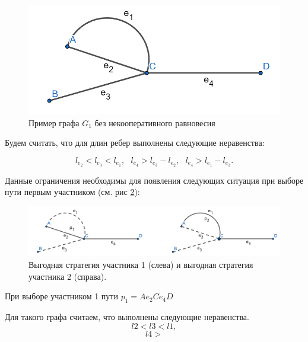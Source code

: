 \documentclass[12pt, a4paper]{article}
\begin{document}
\begin{figure}[hpt]
	\includegraphics[scale = 0.3]{imgs/graph_nocoop.png}
	\centering
	\caption{Пример графа $G_1$ без некооперативного равновесия}
	\label{fig:nocoop}
\end{figure}

Будем считать, что для длин ребер выполнены следующие неравенства:

$$ l_{e_2} < l_{e_3} < l_{e_1}, \text{ } l_{e_4} > l_{e_3} - l_{e_2}, \text{ } l_{e_4} > l_{e_1} - l_{e_3}. $$

Данные ограничения необходимы для появления следующих ситуация при выборе пути первым участником (см. рис \ref{fig:nocoop_str}):

\begin{figure}[hpt]
	\includegraphics[scale = 0.3]{imgs/no_nocoop_rovn.png}
	\centering
	\caption{Выгодная стратегия участника 1 (слева) и выгодная стратегия участника 2 (справа).}
	\label{fig:nocoop_str}
\end{figure}

При выборе участником 1 пути $p_1 = Ae_2Ce_4D$ 

Для такого графа считаем, что выполнены следующие неравенства.
$$l2 < l3 < l1,$$
$$l4 > $$
\end{document}

